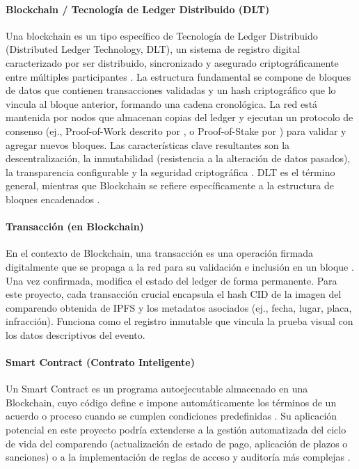 \paragraph{Blockchain / Tecnología de Ledger Distribuido (DLT)}
Una blockchain es un tipo específico de Tecnología de Ledger Distribuido (Distributed Ledger Technology, DLT), un sistema de registro digital caracterizado por ser distribuido, sincronizado y asegurado criptográficamente entre múltiples participantes \parencite{narayanan2016bitcoin}. La estructura fundamental se compone de bloques de datos que contienen transacciones validadas y un hash criptográfico que lo vincula al bloque anterior, formando una cadena cronológica. La red está mantenida por nodos que almacenan copias del ledger y ejecutan un protocolo de consenso (ej., Proof-of-Work descrito por \parencite{nakamoto2008bitcoin}, o Proof-of-Stake por \parencite{king2012ppcoin}) para validar y agregar nuevos bloques. Las características clave resultantes son la descentralización, la inmutabilidad (resistencia a la alteración de datos pasados), la transparencia configurable y la seguridad criptográfica \parencite{swan2015blockchain}. DLT es el término general, mientras que Blockchain se refiere específicamente a la estructura de bloques encadenados \parencite{ukgov2016dlt}.

\paragraph{Transacción (en Blockchain)} 
En el contexto de Blockchain, una transacción es una operación firmada digitalmente que se propaga a la red para su validación e inclusión en un bloque \parencite{antonopoulos2023mastering}. Una vez confirmada, modifica el estado del ledger de forma permanente. Para este proyecto, cada transacción crucial encapsula el hash CID de la imagen del comparendo obtenida de IPFS y los metadatos asociados (ej., fecha, lugar, placa, infracción). Funciona como el registro inmutable que vincula la prueba visual con los datos descriptivos del evento. 

\paragraph{Smart Contract (Contrato Inteligente)} 
Un Smart Contract es un programa autoejecutable almacenado en una Blockchain, cuyo código define e impone automáticamente los términos de un acuerdo o proceso cuando se cumplen condiciones predefinidas \parencite{szabo1997smart, wood2014ethereum}. Su aplicación potencial en este proyecto podría extenderse a la gestión automatizada del ciclo de vida del comparendo (actualización de estado de pago, aplicación de plazos o sanciones) o a la implementación de reglas de acceso y auditoría más complejas \parencite{buterin2014next}. 

